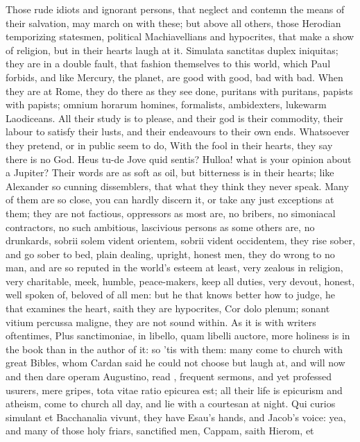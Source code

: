 {Those rude idiots and ignorant persons, that neglect and contemn the
means of their salvation, may march on with these; but above all
others, those Herodian temporizing statesmen, political Machiavellians
and hypocrites, that make a show of religion, but in their hearts laugh
at it. Simulata sanctitas duplex iniquitas; they are in a double fault,
that fashion themselves to this world, which Paul forbids, and
like Mercury, the planet, are good with good, bad with bad. When they
are at Rome, they do there as they see done, puritans with puritans,
papists with papists; omnium horarum homines, formalists, ambidexters,
lukewarm Laodiceans. All their study is to please, and their god
is their commodity, their labour to satisfy their lusts, and their
endeavours to their own ends. Whatsoever they pretend, or in public
seem to do, With the fool in their hearts, they say there is no
God. Heus tu-de Jove quid sentis? Hulloa! what is your opinion about a
Jupiter? Their words are as soft as oil, but bitterness is in their
hearts; like Alexander so cunning dissemblers, that what they
think they never speak. Many of them are so close, you can hardly
discern it, or take any just exceptions at them; they are not factious,
oppressors as most are, no bribers, no simoniacal contractors, no such
ambitious, lascivious persons as some others are, no drunkards, sobrii
solem vident orientem, sobrii vident occidentem, they rise sober, and
go sober to bed, plain dealing, upright, honest men, they do wrong to
no man, and are so reputed in the world's esteem at least, very zealous
in religion, very charitable, meek, humble, peace-makers, keep all
duties, very devout, honest, well spoken of, beloved of all men: but he
that knows better how to judge, he that examines the heart, saith they
are hypocrites, Cor dolo plenum; sonant vitium percussa maligne, they
are not sound within. As it is with writers oftentimes, Plus
sanctimoniae, in libello, quam libelli auctore, more holiness is in the
book than in the author of it: so 'tis with them: many come to church
with great Bibles, whom Cardan said he could not choose but laugh at,
and will now and then dare operam Augustino, read \Austin{}, frequent
sermons, and yet professed usurers, mere gripes, tota vitae ratio
epicurea est; all their life is epicurism and atheism, come to church
all day, and lie with a courtesan at night. Qui curios simulant et
Bacchanalia vivunt, they have Esau's hands, and Jacob's voice: yea, and
many of those holy friars, sanctified men, Cappam, saith Hierom, et
}
